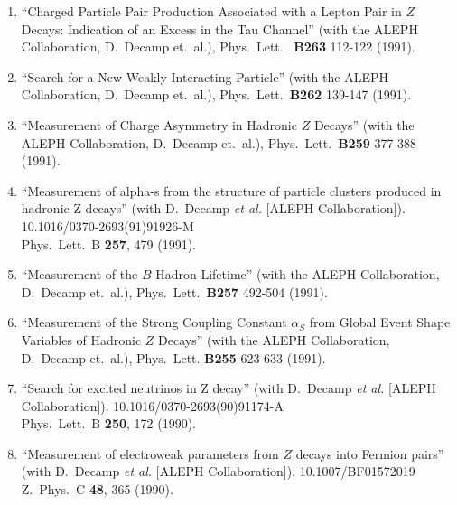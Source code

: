 \begin{enumerate}
\item ``Charged Particle Pair Production Associated with a
        Lepton Pair   in $Z$ Decays: Indication of an Excess
        in the Tau Channel'' (with   the ALEPH
        Collaboration, D.~Decamp et.~al.), Phys.~Lett.~{\bf
        B263}   112-122 (1991).

\item ``Search for a New Weakly Interacting Particle'' (with
        the ALEPH   Collaboration, D.~Decamp et.~al.),
        Phys.~Lett.~{\bf B262} 139-147   (1991).

\item ``Measurement of Charge Asymmetry in Hadronic $Z$
        Decays'' (with   the ALEPH Collaboration, D.~Decamp
        et.~al.), Phys.~Lett.~{\bf B259}   377-388 (1991).

\item ``Measurement of alpha-s from the structure of
        particle clusters produced in hadronic Z decays''
        (with D.~Decamp {\it et al.}  [ALEPH
        Collaboration]). 10.1016/0370-2693(91)91926-M
        \\{}Phys.\ Lett.\ B {\bf 257}, 479 (1991).

\item ``Measurement of the $B$ Hadron Lifetime'' (with the
        ALEPH   Collaboration, D.~Decamp et.~al.),
        Phys.~Lett.~{\bf B257} 492-504   (1991).

\item ``Measurement of the Strong Coupling Constant
        $\alpha_S$ from   Global Event Shape Variables of
        Hadronic $Z$ Decays'' (with the   ALEPH
        Collaboration, D.~Decamp et.~al.), Phys.~Lett. {\bf
        B255}   623-633 (1991).

\item ``Search for excited neutrinos in Z decay'' (with
        D.~Decamp {\it et al.}  [ALEPH Collaboration]).
        10.1016/0370-2693(90)91174-A \\{}Phys.\ Lett.\ B
        {\bf 250}, 172 (1990).

\item ``Measurement of electroweak parameters from $Z$
        decays into Fermion pairs'' (with D.~Decamp {\it et
        al.}  [ALEPH Collaboration]). 10.1007/BF01572019
        \\{}Z.\ Phys.\ C {\bf 48}, 365 (1990).

\end{enumerate}

\newpage

